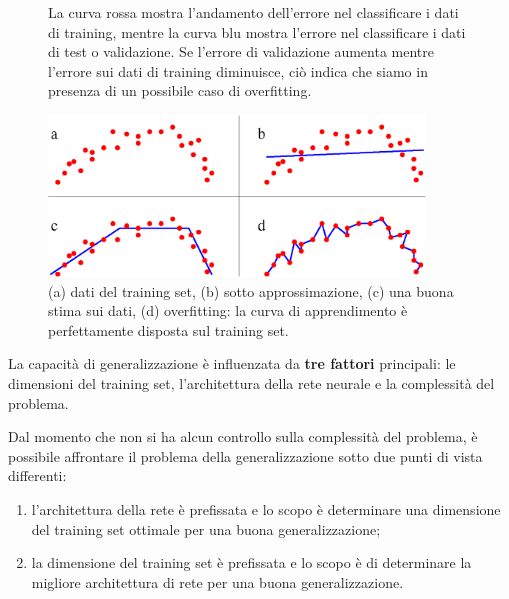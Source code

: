 \begin{figure}[h!]
	\centering
	\caption[Andamento dell'errore e overfitting]{La curva rossa mostra l'andamento dell'errore nel classificare i dati di training, mentre la curva blu mostra l'errore nel classificare i dati di test o validazione. Se l'errore di validazione aumenta mentre l'errore sui dati di training diminuisce, ciò indica che siamo in presenza di un possibile caso di overfitting.}
\end{figure}

\begin{figure}[h!]
	\centering
	\includegraphics[width=10cm]{images/overfit2}
	\caption[Interpolazione e overfitting]{(a) dati del training set, (b) sotto approssimazione, (c) una buona stima sui dati, (d) overfitting: la curva di apprendimento è perfettamente disposta sul training set.}
\end{figure}

La capacità di generalizzazione è influenzata da \textbf{tre fattori} principali: le dimensioni del training set, l'architettura della rete neurale e la complessità del problema.

Dal momento che non si ha alcun controllo sulla complessità del problema, è possibile affrontare il problema della generalizzazione sotto due punti di vista differenti:
\begin{enumerate}
	\item l'architettura della rete è prefissata e lo scopo è determinare una dimensione del training set ottimale per una buona generalizzazione;
	\item la dimensione del training set è prefissata e lo scopo è di determinare la migliore architettura di rete per una buona generalizzazione.
\end{enumerate}

